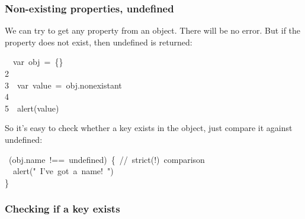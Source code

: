 \documentclass{article}
\begin{document}
\subsubsection{Non-existing properties, undefined}\label{sec3-non-existing-properties-undefined}%

\noindent{}We can try to get any property from an object. There will be no error. But if the property does not exist, then undefined is returned:%
\begin{mdpre}%
~~{var}~obj~=~\{\}\\
{2}\\
{3}~~{var}~value~=~obj.nonexistant\\
{4}\\
{5}~~alert(value)%
\end{mdpre}\noindent{}So it's easy to check whether a key exists in the object, just compare it against undefined:
\begin{mdpre}%
~(obj.name~!==~undefined)~\{~{//~strict(!)~comparison}\\
~~alert({"}{~I}{'}{ve~got~a~name!~}{"})\\
\}%
\end{mdpre}
\subsubsection{Checking if a key exists}\label{sec3-checking-if-a-key-exists}%
\end{document}
